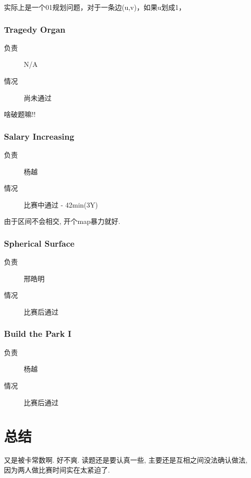 \documentclass[a4paper, 11pt, nofonts, nocap, fancyhdr]{ctexart}
\newcommand{\problem}[1]{\subsubsection{#1}}
\begin{document}
实际上是一个01规划问题，对于一条边(u,v)，如果u划成1，

\problem{Tragedy Organ}

\begin{description}
\item[负责] N/A
\item[情况] 尚未通过
\end{description}

啥破题嘛!!

\problem{Salary Increasing}

\begin{description}
\item[负责] 杨越
\item[情况] 比赛中通过 - 42min(3Y)
\end{description}

由于区间不会相交, 开个map暴力就好.

\problem{Spherical Surface}

\begin{description}
\item[负责] 邢皓明
\item[情况] 比赛后通过
\end{description}

\problem{Build the Park I}

\begin{description}
\item[负责] 杨越
\item[情况] 比赛后通过
\end{description}

\section{总结}

又是被卡常数啊. 好不爽. 读题还是要认真一些, 主要还是互相之间没法确认做法, 因为两人做比赛时间实在太紧迫了.
\end{document}
